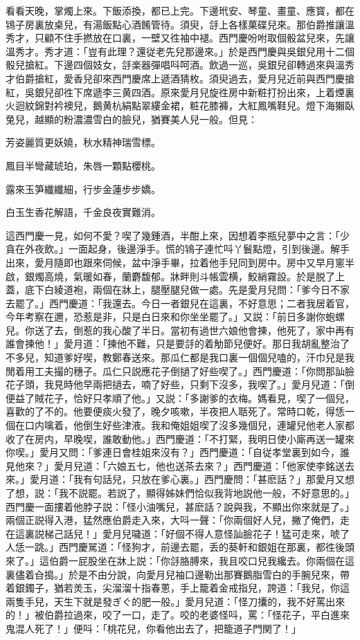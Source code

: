 看看天晚，掌燭上來。下飯添換，都已上完。下邊玳安、琴童、畫童、應寳，都在鴇子房裏放桌兒，有湯飯點心酒餚管待。須臾，㧱上各樣菓碟兒來。那伯爵推讓溫秀才，只顧不住手撚放在口裏，一壁又徃袖中褪。西門慶吩咐取個骰盆兒來，先讓溫秀才。秀才道：「豈有此理？還従老先兒那邊來。」於是西門慶與吳銀兒用十二個骰兒搶紅。下邊四個妓女，㧱楽器彈唱呌呵酒。飲過一巡，吳銀兒卻轉過來與溫秀才伯爵搶紅，愛香兒卻來西門慶席上遞酒猜枚。須臾過去，愛月兒近前與西門慶搶紅，吳銀兒卻徃下席遞李三黄四酒。原來愛月兒旋徃房中新粧打扮出來，上着煙裏火迴紋錦對衿襖兒，鵝黄杭絹點翠縷金裙，粧花膝褲，大紅鳳嘴鞋兒。燈下海獺臥兔兒，越顯的粉濃濃雪白的臉兒，猶賽美人兒一般。但見：

\begin{myquote}
芳姿麗質更妖嬈，秋水精神瑞雪標。

鳳目半彎藏琥珀，朱唇一顆點櫻桃。

露來玉笋纖纖細，行步金蓮步步嬌。

白玉生香花解語，千金良夜實難消。
\end{myquote}

這西門慶一見，如何不愛？喫了幾鍾酒，半酣上來，因想着李瓶兒夢中之言：「少貪在外夜飲。」一面起身，後邊淨手。慌的鴇子連忙呌丫鬟點燈，引到後邊。解手出來，愛月隨即也跟來伺候，盆中淨手畢，拉着他手兒同到房中。房中又早月窻半啟，銀燭高燒，氣暖如春，蘭麝馥郁。牀畔則斗帳雲横，鮫綃霧設。於是脱了上蓋，底下白綾道袍，兩個在牀上，腿壓腿兒做一處。先是愛月兒問：「爹今日不家去罷了。」西門慶道：「我還去。今日一者銀兒在這裏，不好意思；二者我居着官，今年考察在邇，恐惹是非，只是白日來和你坐坐罷了。」又説：「前日多謝你蚫螺兒。你送了去，倒惹的我心酸了半日。當初有過世六娘他會揀，他死了，家中再有誰會揀他！」愛月道：「揀他不難，只是要㧱的着觔節兒便好。那日我胡亂整治了不多兒，知道爹好喫，教鄭春送來。那瓜仁都是我口裏一個個兒嗑的，汗巾兒是我閒着用工夫撮的穗子。瓜仁只説應花子倒撾了好些喫了。」西門慶道：「你問那訕臉花子頭，我見時他早兩把撾去，喃了好些，只剩下沒多，我喫了。」愛月兒道：「倒便益了賊花子，恰好只孝順了他。」又説：「多謝爹的衣梅。媽看見，喫了一個兒，喜歡的了不的。他要便痰火發了，晚夕咳嗽，半夜把人聒死了。常時口乾，得恁一個在口内噙着，他倒生好些津液。我和俺姐姐喫了沒多幾個兒，連罐兒他老人家都收了在房内，早晚喫，誰敢動他。」西門慶道：「不打緊，我明日使小廝再送一罐來你喫。」愛月又問：「爹連日會桂姐來沒有？」西門慶道：「自従孝堂裏到如今，誰見他來？」愛月兒道：「六娘五七，他也送茶去來？」西門慶道：「他家使李銘送去來。」愛月道：「我有句話兒，只放在爹心裏。」西門慶問：「甚麽話？」那愛月又想了想，説：「我不説罷。若説了，顯得姊妹們恰似我背地説他一般，不好意思的。」西門慶一面摟着他脖子説：「怪小油嘴兒，甚麽話？說與我，不顯出你來就是了。」　兩個正説得入港，猛然應伯爵走入來，大呌一聲：「你兩個好人兒，撇了俺們，走在這裏説梯己話兒！」愛月兒噦道：「好個不得人意怪訕臉花子！猛可走來，唬了人恁一跳。」西門慶駡道：「怪狗才，前邊去罷，丢的葵軒和銀姐在那裏，都徃後頭來了。」這伯爵一屁股坐在牀上説：「你㧱胳膊來，我且咬口兒我纔去。你兩個在這裏儘着㒲搗。」於是不由分說，向愛月兒袖口邊勒出那賽鵝脂雪白的手腕兒來，帶着銀鐲子，猶若羙玉，尖溜溜十指春蔥，手上籠着金戒指兒，誇道：「我兒，你這兩隻手兒，天生下就是發ぎぐ的肥一般。」愛月兒道：「怪刀攮的，我不好罵出來的！」被伯爵拉過來，咬了一口，走了。咬的老婆怪呌，罵：「怪花子，平白進來鬼混人死了！」便呌：「桃花兒，你看他出去了，把籠道子門関了！」

